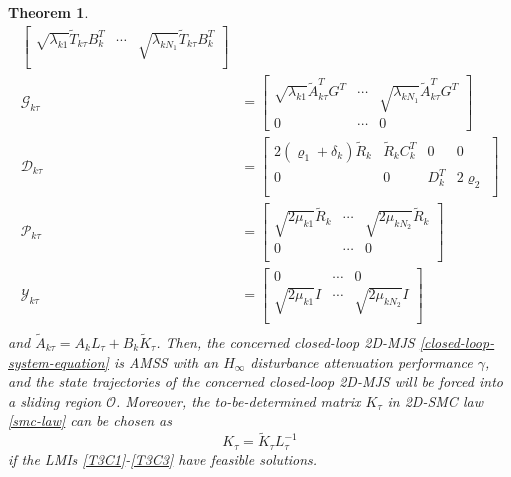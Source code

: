 \documentclass[journal,final,twocolumn]{IEEEtran}
\newtheorem{theorem}{Theorem}
\begin{document}
\begin{theorem}
\begin{equation}
\begin{split}
\begin{bmatrix}
				\sqrt{\lambda_{k1}}\tilde{T}_{k\tau }B^{T}_{k} &\cdots&\sqrt{\lambda_{kN_{1}}} \tilde{T}_{k\tau }B^{T}_{k}\\
			\end{bmatrix} \\
			\mathscr{G}_{k\tau } &=\begin{bmatrix}
				\sqrt{\lambda_{k1}} \tilde{A}^{T}_{k\tau }G^{T}& \cdots&\sqrt{\lambda_{kN_{1}}} \tilde{A}^{T}_{k\tau }G^{T}\\
				0  &\cdots& 0
			\end{bmatrix}\\
			\mathscr{D}_{k\tau } &= \begin{bmatrix}
				2(\varrho_{1}+ \delta_{k} )\tilde{R}_{k}& \tilde{R}_{k}C^{T}_{k}&0&0\\
				0&0&D^{T}_{k}&2\varrho_{2} \\
			\end{bmatrix} \\	
			\mathscr{P}_{k\tau } &= \begin{bmatrix}
				\sqrt{2\mu_{k1}} \tilde{R}_{k} &\cdots &\sqrt{2\mu_{kN_{2}}} \tilde{R}_{k}\\
				0 & \cdots & 0\\
			\end{bmatrix}	\\
			\mathscr{Y}_{k\tau } &= \begin{bmatrix}
				0 & \cdots & 0\\
				\sqrt{2\mu_{k1}} I &\cdots &\sqrt{2\mu_{kN_{2}}} I\\
			\end{bmatrix}	\\						
		\end{split}
	\end{equation}
	and $\tilde{A}_{k\tau } =  A_{k}L_{\tau } + B_{k}\tilde{K}_{\tau }$. Then,  the concerned closed-loop 2D-MJS \eqref{closed-loop-system-equation} is AMSS with an $H_{\infty}$ disturbance attenuation  performance $\gamma$, and the state trajectories of the concerned closed-loop 2D-MJS will be forced into a sliding region $\mathcal{O}$. Moreover, the to-be-determined matrix $K_{\tau }$ in 2D-SMC law \eqref{smc-law} can be chosen as 
	\begin{equation}
		K_{\tau } = \tilde{K}_{\tau }L^{-1}_{\tau }
	\end{equation}
	if the LMIs \eqref{T3C1}-\eqref{T3C3} have feasible solutions.
\end{theorem}
\end{document}
